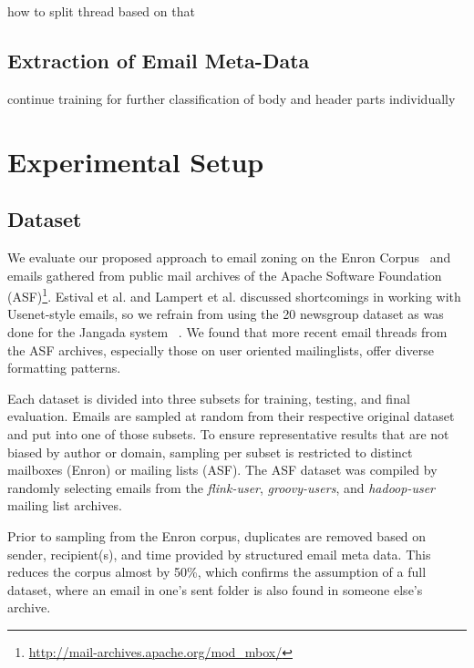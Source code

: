 \documentclass{llncs}
\begin{document}
how to split thread based on that

\subsection{Extraction of Email Meta-Data}
continue training for further classification of body and header parts individually

\section{Experimental Setup}

\subsection{Dataset}
We evaluate our proposed approach to email zoning on the Enron Corpus~\cite{enron} and emails gathered from public mail archives of the Apache Software Foundation (ASF)\footnote{\url{http://mail-archives.apache.org/mod\_mbox/}}. 
Estival et al. and Lampert et al. discussed shortcomings in working with Usenet-style emails, so we refrain from using the 20 newsgroup dataset as was done for the Jangada system ~\cite{profiling,zones,20news}.
We found that more recent email threads from the ASF archives, especially those on user oriented mailinglists, offer diverse formatting patterns.

Each dataset is divided into three subsets for training, testing, and final evaluation.
Emails are sampled at random from their respective original dataset and put into one of those subsets.
To ensure representative results that are not biased by author or domain, sampling per subset is restricted to distinct mailboxes (Enron) or mailing lists (ASF).
The ASF dataset was compiled by randomly selecting emails from the \textit{flink-user}, \textit{groovy-users}, and \textit{hadoop-user} mailing list archives.

Prior to sampling from the Enron corpus, duplicates are removed based on sender, recipient(s), and time provided by structured email meta data.
This reduces the corpus almost by 50\%, which confirms the assumption of a full dataset, where an email in one's sent folder is also found in someone else's archive.
\end{document}
